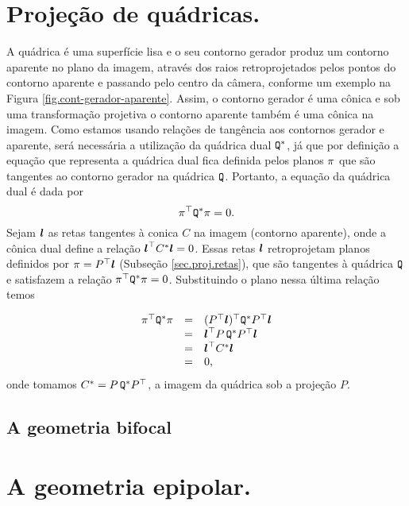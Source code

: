 \section*{Projeção de quádricas.}
A quádrica é uma superfície lisa  e o seu contorno gerador produz um contorno aparente no plano da imagem, através dos raios retroprojetados pelos pontos do contorno aparente e passando pelo centro da câmera, conforme um exemplo na Figura \ref{fig.cont-gerador-aparente}. Assim, o contorno gerador é uma cônica e sob uma transformação projetiva o contorno aparente também é uma cônica na imagem. Como estamos usando relações de tangência aos contornos gerador e aparente, será necessária a utilização da quádrica dual	${\tt Q}^*$, já que por definição a equação que representa a quádrica dual fica definida pelos planos $\pi$ que são tangentes ao contorno gerador na quádrica ${\tt Q}$. Portanto, a equação da quádrica dual é dada por
\begin{equation*}
\pi^\top {\tt Q}^*\pi=0.
\end{equation*}
Sejam $\boldsymbol{l}$ as retas tangentes à conica $C$ na imagem (contorno aparente), onde a cônica dual define a relação $\boldsymbol{l}^\top C^*\boldsymbol{l}=0$. Essas retas $\boldsymbol{l}$ retroprojetam planos definidos por $\pi=P^\top\boldsymbol{l}$ (Subseção \ref{sec.proj.retas}), que são tangentes à quádrica ${\tt Q}$ e satisfazem a relação $\pi^\top {\tt Q}^*\pi=0$. Substituindo o plano nessa última relação temos

\begin{equation*}
\begin{array}{rcl}
\pi^\top {\tt Q}^*\pi&=&(P^\top\boldsymbol{l})^\top {\tt Q}^*P^\top\boldsymbol{l}\\
&=&\boldsymbol{l}^\top P\,{\tt Q}^*P^\top\boldsymbol{l}\\
&=&\boldsymbol{l}^\top C^*\boldsymbol{l}\\
&=&0,
\end{array}
\end{equation*}
onde tomamos $C^*=P\,{\tt Q}^*P^\top$, a imagem da quádrica sob a projeção $P$.

\subsection{A geometria bifocal}

\section*{A geometria epipolar.}


